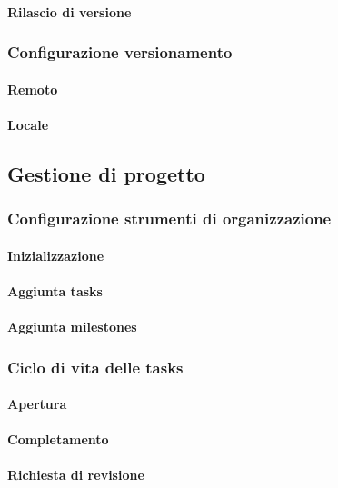 \paragraph{Rilascio di versione}

\subsubsection{Configurazione versionamento}

\paragraph{Remoto}
\paragraph{Locale}
		
\subsection{Gestione di progetto}

\subsubsection{Configurazione strumenti di organizzazione}
	\paragraph{Inizializzazione}
	\paragraph{Aggiunta tasks}
	\paragraph{Aggiunta milestones}

\subsubsection{Ciclo di vita delle tasks}
	\paragraph{Apertura}
	\paragraph{Completamento}
	\paragraph{Richiesta di revisione}

